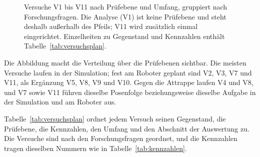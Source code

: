 \begin{figure}[htbp]
  \centering
  
  \caption[Versuche nach Prüfebene und Umfang]{Versuche V1 bis V11 nach Prüfebene und Umfang, gruppiert nach Forschungsfragen. Die Analyse (V1) ist keine Prüfebene und steht deshalb außerhalb des Pfeils; V11 wird zusätzlich einmal eingerichtet. Einzelheiten zu Gegenstand und Kennzahlen enthält Tabelle~\ref{tab:versuchsplan}.}
  \label{fig:versuchsmatrix}
\end{figure}

Die Abbildung macht die Verteilung über die Prüfebenen sichtbar.
Die meisten Versuche laufen in der Simulation; fest am Roboter geplant sind V2, V3, V7 und V11, als Ergänzung V5, V8, V9 und V10.
Gegen die Attrappe laufen V4 und V8, und V7 sowie V11 führen dieselbe Posenfolge beziehungsweise dieselbe Aufgabe in der Simulation und am Roboter aus.

Tabelle~\ref{tab:versuchsplan} ordnet jedem Versuch seinen Gegenstand, die Prüfebene, die Kennzahlen, den Umfang und den Abschnitt der Auswertung zu.
Die Versuche sind nach den Forschungsfragen geordnet, und die Kennzahlen tragen dieselben Nummern wie in Tabelle~\ref{tab:kennzahlen}.

